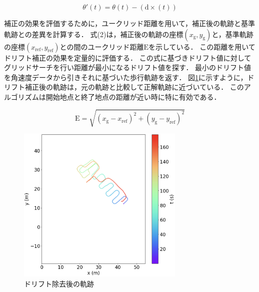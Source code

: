 \documentclass[Japanese]{dicomopapers}
\begin{document}
\vspace{5mm} %

\begin{equation}
	\theta'(t) = \theta(t) - (\mathrm{d} \times (t))
\end{equation}

\vspace{5mm} %

補正の効果を評価するために，ユークリッド距離を用いて，補正後の軌跡と基準軌跡との差異を計算する．
式(2)は，補正後の軌跡の座標$(x_{\mathrm{g}}, y_{\mathrm{g}})$と，基準軌跡の座標$(x_{\mathrm{ref}}, y_{\mathrm{ref}})$との間のユークリッド距離$\mathrm{E}$を示している．
この距離を用いてドリフト補正の効果を定量的に評価する．
この式に基づきドリフト値に対してグリッドサーチを行い距離が最小になるドリフト値を探す．
最小のドリフト値を角速度データから引きそれに基づいた歩行軌跡を返す．
図\ref{fig:pdr-remove-drift}に示すように，ドリフト補正後の軌跡は，元の軌跡と比較して正解軌跡に近づいている．
このアルゴリズムは開始地点と終了地点の距離が近い時に特に有効である．

\vspace{5mm} %
\begin{equation}
	\mathrm{E} = \sqrt{(x_{\mathrm{g}} - x_{\mathrm{ref}})^2 + (y_{\mathrm{g}} - y_{\mathrm{ref}})^2}
\end{equation}
\vspace{5mm} %




\begin{figure}[h]
	\centering
	\includegraphics[width=80mm]{image/pdr-remove-drift-two.jpg}
	\caption{ドリフト除去後の軌跡} \label{fig:pdr-remove-drift}
\end{figure}
\end{document}

